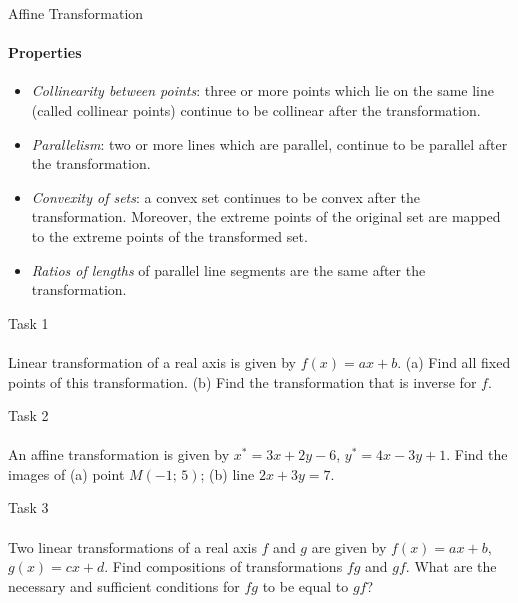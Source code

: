 \documentclass[aspectratio=169]{beamer}
\begin{document}
\begin{frame}[t]{Affine Transformation}
    \framesubtitle{Properties}
        \begin{itemize}
            \item \textit{Collinearity between points}: three or more points which lie on the same line (called collinear points) continue to be collinear after the transformation.
            \item \textit{Parallelism}: two or more lines which are parallel, continue to be parallel after the transformation.
            \item \textit{Convexity of sets}: a convex set continues to be convex after the transformation. Moreover, the extreme points of the original set are mapped to the extreme points of the transformed set.
            \item \textit{Ratios of lengths} of parallel line segments are the same after the transformation.
        \end{itemize}
    \end{frame}

\begin{frame}[t]{Task 1}
    \framesubtitle{}
    Linear transformation of a real axis is given by $f(x)=ax+b$. (a) Find all fixed points of this transformation. (b) Find the transformation that is inverse for $f$.

\end{frame}

\begin{frame}[t]{Task 2}
    \framesubtitle{}
    An affine transformation is given by $x^*=3x+2y-6$, $y^*=4x-3y+1$. Find the images of (a) point $M(-1;\,5)$; (b) line $2x+3y=7$.

\end{frame}


\begin{frame}[t]{Task 3}
    \framesubtitle{}
    Two linear transformations of a real axis $f$ and $g$ are given by $f(x)=ax+b$, $g(x)=cx+d$. Find compositions of transformations $fg$ and $gf$. What are the necessary and sufficient conditions for $fg$ to be equal to $gf$?
    
\end{frame}
\end{document}
